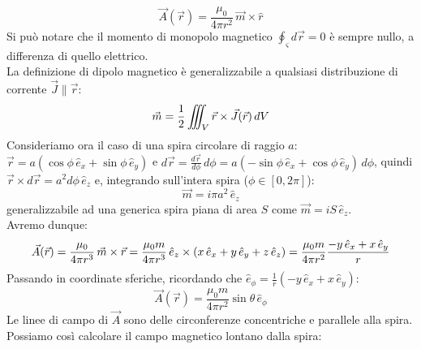 \begin{equation}
	\vec{A}(\vec{r}) = \displaystyle\frac{\mu_0}{4\pi r^2} \, \vec{m}\times\hat{r}
	\label{eq:pot-dip}
\end{equation}
Si può notare che il momento di monopolo magnetico $ \oint_{\varsigma} d\vec{r} = 0  $ è sempre nullo, a differenza di quello elettrico. \\ 
%
La definizione di dipolo magnetico è generalizzabile a qualsiasi distribuzione di corrente $ \vec{J} \parallel \vec{r} $:
\begin{equation}
	\vec{m} = \frac{1}{2} \iiint_V \vec{r}\times\vec{J}(\vec{r}) \, dV
	\label{eq:dip-mag-def}
\end{equation}
%
Consideriamo ora il caso di una spira circolare di raggio $ a $: $ \vec{r} = a (\cos\phi\,\hat{e}_x + \sin\phi\,\hat{e}_y) $ e $ d\vec{r} = \frac{d\vec{r}}{d\phi} \,d\phi = a (-\sin\phi\,\hat{e}_x + \cos\phi\,\hat{e}_y) \,d\phi $, quindi $ \vec{r}\times d\vec{r} = a^2 d\phi \, \hat{e}_z $ e, integrando sull'intera spira ($ \phi\in[0,2\pi] $):
\begin{equation}
	\vec{m} = i \pi a^2 \, \hat{e}_z
	\label{eq:mom-sp-circ}
\end{equation}
generalizzabile ad una generica spira piana di area $ S $ come $ \vec{m} = i S \,\hat{e}_z $. \\ 
%
Avremo dunque:
\begin{equation}
	\vec{A}(\vec{r}) = \displaystyle\frac{\mu_0}{4\pi r^3} \, \vec{m}\times\vec{r} = \displaystyle\frac{\mu_0 m}{4\pi r^3} \, \hat{e}_z \times\left(x\,\hat{e}_x + y\,\hat{e}_y + z\,\hat{e}_z\right) = \displaystyle\frac{\mu_0 m}{4\pi r^2} \displaystyle\frac{-y \, \hat{e}_x + x \, \hat{e}_y}{r}
	\label{eq:calc-po-sp-circ}
\end{equation}
Passando in coordinate sferiche, ricordando che $ \hat{e}_{\phi} = \frac{1}{r} (-y \, \hat{e}_x + x \, \hat{e}_y) $:
\begin{equation}
	\vec{A}(\vec{r}) = \displaystyle\frac{\mu_0 m}{4\pi r^2} \sin\theta \,\hat{e}_{\phi}
	\label{eq:po-sp-circ}
\end{equation}
Le linee di campo di $ \vec{A} $ sono delle circonferenze concentriche e parallele alla spira. \\ 
%
Possiamo così calcolare il campo magnetico lontano dalla spira:
